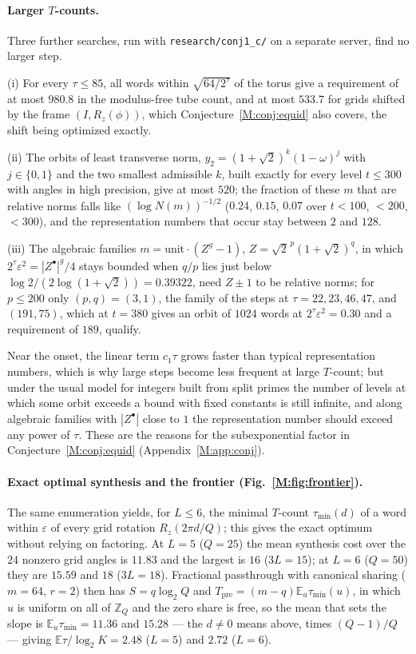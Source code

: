 \documentclass[aps,prx,twocolumn,superscriptaddress,nofootinbib,longbibliography]{revtex4-2}
\theoremstyle{plain}
\theoremstyle{definition}
\theoremstyle{remark}
\newcommand{\Tpre}{T_{\mathrm{pre}}}
\newcommand{\E}{\mathbb{E}}
\newcommand{\Z}{\mathbb{Z}}
\begin{document}
\paragraph{Larger $T$-counts.} Three further searches, run with \texttt{research/conj1\_c/} on a separate server, find no larger step.

(i) For every $\tau\le85$, all words within $\sqrt{64/2^\tau}$ of the torus give a requirement of at most $980.8$ in the modulus-free tube count, and at most $533.7$ for grids shifted by the frame $(I,R_z(\phi))$, which Conjecture~\ref{M:conj:equid} also covers, the shift being optimized exactly. 

(ii) The orbits of least transverse norm, $y_2=(1+\sqrt2)^k(1-\omega)^j$ with $j\in\{0,1\}$ and the two smallest admissible $k$, built exactly for every level $t\le300$ with angles in high precision, give at most $520$; the fraction of these $m$ that are relative norms falls like $(\log N(m))^{-1/2}$ ($0.24$, $0.15$, $0.07$ over $t<100$, $<200$, $<300$), and the representation numbers that occur stay between $2$ and $128$. 

(iii) The algebraic families $m=\text{unit}\cdot(Z^g-1)$, $Z=\sqrt2^{\,p}(1+\sqrt2)^q$, in which $2^\tau\varepsilon^2=|Z^\bullet|^g/4$ stays bounded when $q/p$ lies just below $\log2/(2\log(1+\sqrt2))=0.39322$, need $Z\pm1$ to be relative norms; for $p\le200$ only $(p,q)=(3,1)$, the family of the steps at $\tau=22,23,46,47$, and $(191,75)$, which at $t=380$ gives an orbit of $1024$ words at $2^\tau\varepsilon^2=0.30$ and a requirement of $189$, qualify. 

Near the onset, the linear term $c_1\tau$ grows faster than typical representation numbers, which is why large steps become less frequent at large $T$-count; but under the usual model for integers built from split primes the number of levels at which some orbit exceeds a bound with fixed constants is still infinite, and along algebraic families with $|Z^\bullet|$ close to $1$ the representation number should exceed any power of $\tau$. These are the reasons for the subexponential factor in Conjecture~\ref{M:conj:equid} (Appendix~\ref{M:app:conj}).

\paragraph{Exact optimal synthesis and the frontier (Fig.~\ref{M:fig:frontier}).} The same enumeration yields, for $L\le6$, the minimal $T$-count $\tau_{\min}(d)$ of a word within $\varepsilon$ of every grid rotation $R_z(2\pi d/Q)$; this gives the exact optimum without relying on factoring. At $L=5$ ($Q=25$) the mean synthesis cost over the $24$ nonzero grid angles is $11.83$ and the largest is $16$ ($3L=15$); at $L=6$ ($Q=50$) they are $15.59$ and $18$ ($3L=18$). Fractional passthrough with canonical sharing ($m=64$, $r=2$) then has $S=q\log_2Q$ and $\Tpre=(m-q)\E_u\tau_{\min}(u)$, in which $u$ is uniform on all of $\Z_Q$ and the zero share is free, so the mean that sets the slope is $\E_u\tau_{\min}=11.36$ and $15.28$ --- the $d\ne0$ means above, times $(Q-1)/Q$ --- giving $\E\tau/\log_2K=2.48$ ($L=5$) and $2.72$ ($L=6$). 
\end{document}
